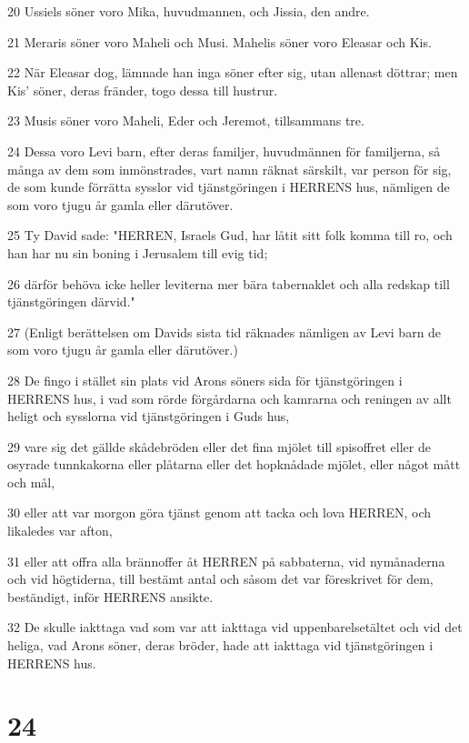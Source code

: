 \par 20 Ussiels söner voro Mika, huvudmannen, och Jissia, den andre.
\par 21 Meraris söner voro Maheli och Musi. Mahelis söner voro Eleasar och Kis.
\par 22 När Eleasar dog, lämnade han inga söner efter sig, utan allenast döttrar; men Kis' söner, deras fränder, togo dessa till hustrur.
\par 23 Musis söner voro Maheli, Eder och Jeremot, tillsammans tre.
\par 24 Dessa voro Levi barn, efter deras familjer, huvudmännen för familjerna, så många av dem som inmönstrades, vart namn räknat särskilt, var person för sig, de som kunde förrätta sysslor vid tjänstgöringen i HERRENS hus, nämligen de som voro tjugu år gamla eller därutöver.
\par 25 Ty David sade: "HERREN, Israels Gud, har låtit sitt folk komma till ro, och han har nu sin boning i Jerusalem till evig tid;
\par 26 därför behöva icke heller leviterna mer bära tabernaklet och alla redskap till tjänstgöringen därvid."
\par 27 (Enligt berättelsen om Davids sista tid räknades nämligen av Levi barn de som voro tjugu år gamla eller därutöver.)
\par 28 De fingo i stället sin plats vid Arons söners sida för tjänstgöringen i HERRENS hus, i vad som rörde förgårdarna och kamrarna och reningen av allt heligt och sysslorna vid tjänstgöringen i Guds hus,
\par 29 vare sig det gällde skådebröden eller det fina mjölet till spisoffret eller de osyrade tunnkakorna eller plåtarna eller det hopknådade mjölet, eller något mått och mål,
\par 30 eller att var morgon göra tjänst genom att tacka och lova HERREN, och likaledes var afton,
\par 31 eller att offra alla brännoffer åt HERREN på sabbaterna, vid nymånaderna och vid högtiderna, till bestämt antal och såsom det var föreskrivet för dem, beständigt, inför HERRENS ansikte.
\par 32 De skulle iakttaga vad som var att iakttaga vid uppenbarelsetältet och vid det heliga, vad Arons söner, deras bröder, hade att iakttaga vid tjänstgöringen i HERRENS hus.

\chapter{24}


